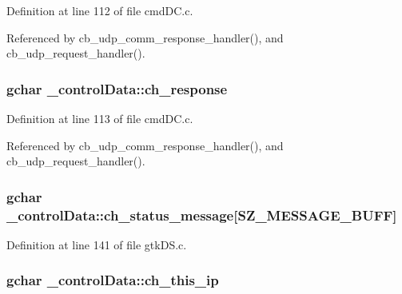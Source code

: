Definition at line 112 of file cmd\+D\+C.\+c.



Referenced by cb\+\_\+udp\+\_\+comm\+\_\+response\+\_\+handler(), and cb\+\_\+udp\+\_\+request\+\_\+handler().

\hypertarget{struct__control_data_a9423e8582b05e2dde58b7302bee5559b}{}
\subsubsection[{ch\+\_\+response}]{\setlength{\rightskip}{0pt plus 5cm}gchar \+\_\+control\+Data\+::ch\+\_\+response}\label{struct__control_data_a9423e8582b05e2dde58b7302bee5559b}


Definition at line 113 of file cmd\+D\+C.\+c.



Referenced by cb\+\_\+udp\+\_\+comm\+\_\+response\+\_\+handler(), and cb\+\_\+udp\+\_\+request\+\_\+handler().

\hypertarget{struct__control_data_aa6d5e703090d185edd3e0b5224542ce5}{}
\subsubsection[{ch\+\_\+status\+\_\+message}]{\setlength{\rightskip}{0pt plus 5cm}gchar \+\_\+control\+Data\+::ch\+\_\+status\+\_\+message\mbox{[}{\bf S\+Z\+\_\+\+M\+E\+S\+S\+A\+G\+E\+\_\+\+B\+U\+F\+F}\mbox{]}}\label{struct__control_data_aa6d5e703090d185edd3e0b5224542ce5}


Definition at line 141 of file gtk\+D\+S.\+c.

\hypertarget{struct__control_data_ac48fc4263dd4a6bad484b93fbf1ffe1b}{}
\subsubsection[{ch\+\_\+this\+\_\+ip}]{\setlength{\rightskip}{0pt plus 5cm}gchar \+\_\+control\+Data\+::ch\+\_\+this\+\_\+ip}\label{struct__control_data_ac48fc4263dd4a6bad484b93fbf1ffe1b}



